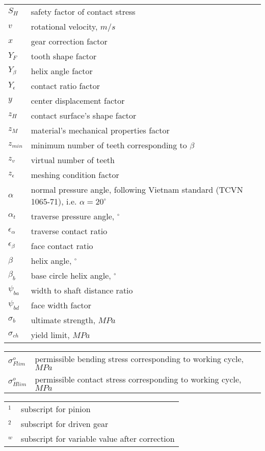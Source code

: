 \begin{tabular}[t]{lp{6.5cm}}
	$ S_H $ & safety factor of contact stress\\
	$ v $ & rotational velocity, $ m/s $\\
	$ x $ & gear correction factor\\
	$ Y_F $ & tooth shape factor\\
	$ Y_\beta $ & helix angle factor\\
	$ Y_\epsilon $ & contact ratio factor\\
	$ y $ & center displacement factor\\
	$ z_H $ & contact surface's shape factor\\
	$ z_M $ & material's mechanical properties factor \\
	$ z_{min} $ & minimum number of teeth corresponding to $ \beta $\\
	$ z_v $ & virtual number of teeth\\
	$ z_\epsilon $ & meshing condition factor\\
	$ \alpha $ & normal pressure angle, following Vietnam standard (TCVN 1065-71), i.e. $ \alpha = 20^\circ $\\
	$ \alpha_t $ & traverse pressure angle, $ ^\circ $\\
	$ \epsilon_\alpha $ & traverse contact ratio\\
	$ \epsilon_\beta $ & face contact ratio\\
	$ \beta $ & helix angle, $ ^\circ $\\
	$ \beta_b $ & base circle helix angle, $ ^\circ $\\
	$ \psi_{ba} $ & width to shaft distance ratio\\
	$ \psi_{bd} $ & face width factor \\
	$ \sigma_b $ & ultimate strength, $ MPa $\\
	$ \sigma_{ch} $ & yield limit, $ MPa $\\
\end{tabular}\newpage
\begin{tabular}[t]{lp{6.5cm}}
	$ \sigma_{Flim}^o $ & permissible bending stress corresponding to working cycle, $ MPa $\\
	$ \sigma_{Hlim}^o $ & permissible contact stress corresponding to working cycle, $ MPa $\\
\end{tabular}
\begin{tabular}[t]{lp{6.5cm}}
	$ _1 $ & subscript for pinion\\
	$ _2 $ & subscript for driven gear\\
	$ _w $ & subscript for variable value after correction\\
\end{tabular}

